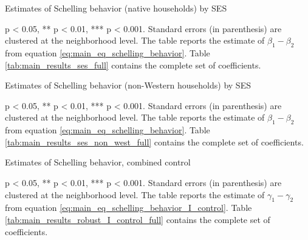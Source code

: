 \documentclass[../main.tex]{subfiles}
\begin{document}
\begin{landscape}
\begin{table}[H]
    \centering
    \caption{Estimates of Schelling behavior (native households) by SES}
    \label{tab:main_results_ses}
    \begin{adjustbox}{width = 0.65\linewidth, center}    
    \begin{threeparttable}
            
    \begin{tablenotes}[flushleft]
    \item \scriptsize * p < 0.05, ** p < 0.01, *** p < 0.001. Standard errors (in parenthesis) are clustered at the neighborhood level. The table reports the estimate of $\beta_1 - \beta_2$ from equation \ref{eq:main_eq_schelling_behavior}. Table \ref{tab:main_results_ses_full} contains the complete set of coefficients.
    \end{tablenotes}
    \end{threeparttable}
    \end{adjustbox}
\end{table}
\begin{table}[H]
    \centering
    \caption{Estimates of Schelling behavior (non-Western households) by SES}
    \label{tab:main_results_ses_non_west}
    \begin{adjustbox}{width = 0.65\linewidth, center}    
    \begin{threeparttable}
            
    \begin{tablenotes}[flushleft]
    \item \scriptsize * p < 0.05, ** p < 0.01, *** p < 0.001. Standard errors (in parenthesis) are clustered at the neighborhood level. The table reports the estimate of $\beta_1 - \beta_2$ from equation \ref{eq:main_eq_schelling_behavior}. Table \ref{tab:main_results_ses_non_west_full} contains the complete set of coefficients.
    \end{tablenotes}
    \end{threeparttable}
    \end{adjustbox}
\end{table}

\end{landscape}

\begin{table}[H]
    \centering
    \caption{Estimates of Schelling behavior, combined control}
    \label{tab:main_results_robust_I_control}
    \begin{threeparttable}
            
    \begin{tablenotes}[flushleft]
    \item \scriptsize * p < 0.05, ** p < 0.01, *** p < 0.001. Standard errors (in parenthesis) are clustered at the neighborhood level. The table reports the estimate of $\gamma_1 - \gamma_2$ from equation \ref{eq:main_eq_schelling_behavior_I_control}. Table \ref{tab:main_results_robust_I_control_full} contains the complete set of coefficients. 
    \end{tablenotes}
    \end{threeparttable}
\end{table}
\end{document}
